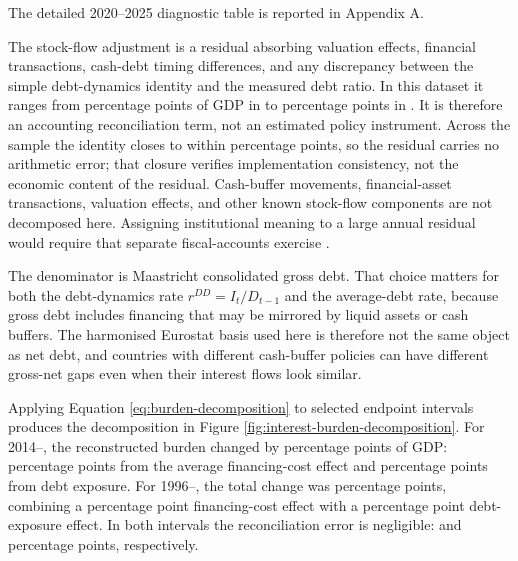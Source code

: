 \documentclass[11pt,a4paper]{article}
\begin{document}
The detailed 2020--2025 diagnostic table is reported in Appendix A.

The stock-flow adjustment is a residual absorbing valuation effects, financial
transactions, cash-debt timing differences, and any discrepancy between the
simple debt-dynamics identity and the measured debt ratio. In this dataset it
ranges from \StockFlowMinPp{} percentage points of GDP in \StockFlowMinYear{} to
\StockFlowMaxPp{} percentage points in \StockFlowMaxYear{}. It is therefore an
accounting reconciliation term, not an estimated policy instrument. Across the
sample the identity closes to within \DebtDynamicsMaxReconciliationErrorPp{}
percentage points, so the residual carries no arithmetic error; that closure
verifies implementation consistency, not the economic content of the residual.
Cash-buffer movements, financial-asset transactions, valuation effects, and
other known stock-flow components are not decomposed here. Assigning
institutional meaning to a large annual residual would require that separate
fiscal-accounts exercise \cite{weber2012,seiferling2013,campos2006}.

The denominator is Maastricht consolidated gross debt. That choice matters for
both the debt-dynamics rate \(r^{DD}=I_t/D_{t-1}\) and the average-debt rate,
because gross debt includes financing that may be mirrored by liquid assets or
cash buffers. The harmonised Eurostat basis used here is therefore not the same
object as net debt, and countries with different cash-buffer policies can have
different gross-net gaps even when their interest flows look similar.

\label{sec:burden-decomposition}
Applying Equation \ref{eq:burden-decomposition} to selected endpoint intervals
produces the decomposition in Figure \ref{fig:interest-burden-decomposition}.
For 2014--\LatestYear{}, the reconstructed burden changed by
\DecompTotalTwentyFourteenToLatestPp{} percentage points of GDP:
\DecompRateTwentyFourteenToLatestPp{} percentage points from the average
financing-cost effect and \DecompExposureTwentyFourteenToLatestPp{} percentage
points from debt exposure. For 1996--\LatestYear{}, the total change was
\DecompTotalNineteenNinetySixToLatestPp{} percentage points, combining a
\DecompRateNineteenNinetySixToLatestPp{} percentage point financing-cost effect
with a \DecompExposureNineteenNinetySixToLatestPp{} percentage point
debt-exposure effect. In both intervals the reconciliation error is
negligible: \DecompErrorTwentyFourteenToLatestPp{} and
\DecompErrorNineteenNinetySixToLatestPp{} percentage points, respectively.
\end{document}
